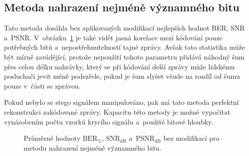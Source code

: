 \subsection*{Metoda nahrazení nejméně významného bitu}

Tato metoda dosáhla bez aplikovaných modifikací nejlepších hodnot BER, SNR
a~PSNR. V~obrázku~\ref{pic:no-mod-params-mean-values-lsb} je také vidět jasná
korelace mezi kódování pouze potřebných bitů a~nepostřehnutelností tajné
zprávy. Avšak tato statistika může být mírně zavádějící, protože nepoužití
tohoto parametru přidává náhodný šum přes celou délku nahrávky, který se při
kódování delší zprávy může lidskému posluchači jevit méně podezřele, pokud je
šum slyšet všude na rozdíl od šumu pouze v~části se zprávou.

Pokud nebylo se stego signálem manipulováno, pak má tato metoda perfektní
rekonstrukci zakódované zprávy. Kapacitu této metody je možné vypočítat
vynásobením počtu vzorků krycího signálu a~použité bitové hloubky.

\begin{figure}[hbt]
    \table
    \centering
    \caption{Průměrné hodnoty $\mathrm{BER}_{\%}$, $\mathrm{SNR}_\mathrm{dB}$
    a~$\mathrm{PSNR}_\mathrm{dB}$ bez modifikací pro metodu nahrazení nejméně
    významného bitu.}
    \label{pic:no-mod-params-mean-values-lsb}
\end{figure}

